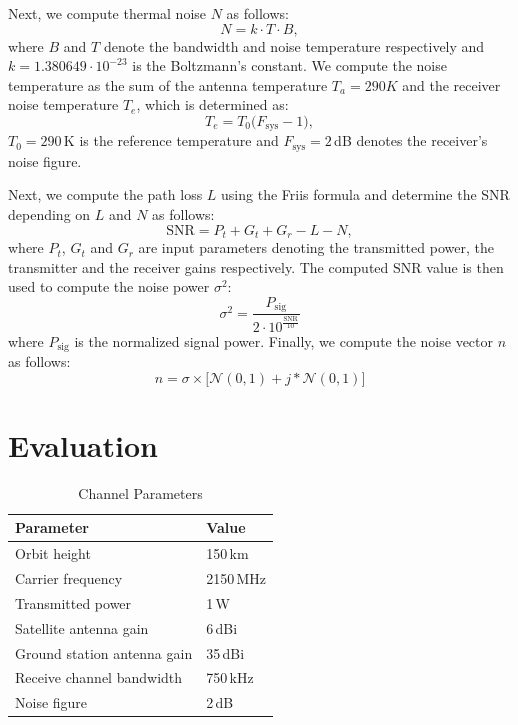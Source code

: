 \documentclass[conference]{IEEEtran}
\begin{document}
Next, we compute thermal noise $N$ as follows:
%
\begin{equation}
  N=k \cdot T \cdot B,
\end{equation}
%
where $B$ and $T$ denote the bandwidth and noise temperature respectively and $k = 1.380649 \cdot 10^{-23}$ is the Boltzmann's constant.
We compute the noise temperature as the sum of the antenna temperature $T_a = 290 K$ and the receiver noise temperature $T_e$, which is determined as:
%
\begin{equation}
  T_e = T_0 \big(F_{\mathrm{sys}} - 1 \big),
\end{equation}
%
$T_0 = 290$\,K is the reference temperature and $F_{\textrm{sys}} = 2$\,dB denotes the receiver's noise figure.

Next, we compute the path loss $L$ using the Friis formula \cite{} and determine the SNR depending on $L$ and $N$ as follows:
%
\begin{equation}
  \mathrm{SNR} = P_t + G_t + G_r - L - N,
\end{equation}
%
where $P_t$, $G_t$ and $G_r$ are input parameters denoting the transmitted power, the transmitter and the receiver gains respectively. 
The computed $\mathrm{SNR}$ value is then used to compute the noise power $\sigma^2$:
%
\begin{equation}
  \sigma^2 = \frac{P_{\mathrm{sig}}}{2 \cdot 10^{\frac{\mathrm{SNR}}{10}}}
\end{equation}
%
where $P_{\mathrm{sig}}$ is the normalized signal power.
Finally, we compute the noise vector $n$ as follows:
%
\begin{equation}
  n = \sigma \times \bigl[\mathcal{N}(0,1) + j * \mathcal{N}(0,1) \bigr] 
\end{equation}
%


\section{Evaluation}
\label{sec:evaluation}

\begin{table}
  \caption{Channel Parameters}
  \label{tab:channel_parameters}

  \centering
	\begin{tabular}{ll}
		\toprule
    Parameter & Value \\
    \midrule
		Orbit height & 150\,km \\
		Carrier frequency & 2150\,MHz \\
    Transmitted power & 1\,W \\
    Satellite antenna gain & 6\,dBi \\
    Ground station antenna gain & 35\,dBi \\
		Receive channel bandwidth & 750\,kHz \\
		Noise figure & 2\,dB \\
		\bottomrule
	\end{tabular}
\end{table}
\end{document}
